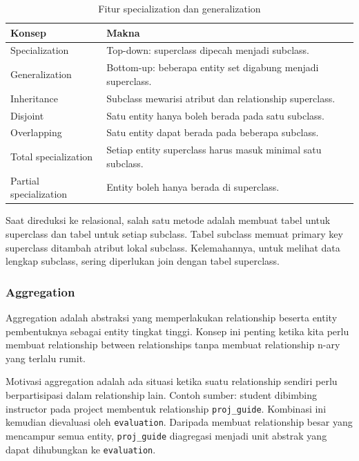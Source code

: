 \begin{table}[H]
\centering
\begin{tabularx}{\textwidth}{|L{0.26\textwidth}|X|}
\hline
\textbf{Konsep} & \textbf{Makna} \\
\hline
Specialization & Top-down: superclass dipecah menjadi subclass. \\
\hline
Generalization & Bottom-up: beberapa entity set digabung menjadi superclass. \\
\hline
Inheritance & Subclass mewarisi atribut dan relationship superclass. \\
\hline
Disjoint & Satu entity hanya boleh berada pada satu subclass. \\
\hline
Overlapping & Satu entity dapat berada pada beberapa subclass. \\
\hline
Total specialization & Setiap entity superclass harus masuk minimal satu subclass. \\
\hline
Partial specialization & Entity boleh hanya berada di superclass. \\
\hline
\end{tabularx}
\caption{Fitur specialization dan generalization}
\label{tab:specialization-generalization}
\end{table}

Saat direduksi ke relasional, salah satu metode adalah membuat tabel untuk superclass dan tabel untuk setiap subclass. Tabel subclass memuat primary key superclass ditambah atribut lokal subclass. Kelemahannya, untuk melihat data lengkap subclass, sering diperlukan join dengan tabel superclass.

\subsubsection{Aggregation}

\begin{jawab}
Aggregation adalah abstraksi yang memperlakukan relationship beserta entity pembentuknya sebagai entity tingkat tinggi. Konsep ini penting ketika kita perlu membuat relationship between relationships tanpa membuat relationship n-ary yang terlalu rumit.
\end{jawab}

Motivasi aggregation adalah ada situasi ketika suatu relationship sendiri perlu berpartisipasi dalam relationship lain. Contoh sumber: student dibimbing instructor pada project membentuk relationship \texttt{proj\_guide}. Kombinasi ini kemudian dievaluasi oleh \texttt{evaluation}. Daripada membuat relationship besar yang mencampur semua entity, \texttt{proj\_guide} diagregasi menjadi unit abstrak yang dapat dihubungkan ke \texttt{evaluation}.


